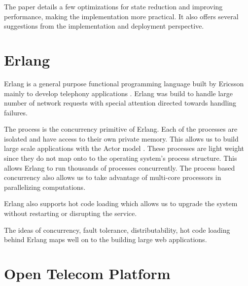 The paper details a few optimizations for state reduction and improving
performance, making the implementation more practical. It also offers
several suggestions from the implementation and deployment perspective.

\section{Erlang}

Erlang \citep{erlang} is a general purpose functional
programming%
 language built by Ericsson mainly to develop telephony applications
\citep{Armstrong07}. Erlang was build to handle large number of network
requests with special attention directed towards handling failures.

The process is the concurrency primitive of Erlang. Each of the processes are
isolated and have access to their own private memory. This allows us to build
large scale applications with the Actor model%
\citep{Clinger81}. These processes are light weight since they do not map onto
to the operating system's process structure. This allows Erlang to run
thousands of processes concurrently. The process based concurrency also allows
us to take advantage of multi-core processors in parallelizing computations.

Erlang also supports hot code loading%
which allows us to upgrade the system
without restarting or disrupting the service.

The ideas of concurrency, fault tolerance, distributability, hot code loading
behind Erlang maps well on to the building large web applications.

\section{Open Telecom Platform}
\label{section:concepts.otp}

